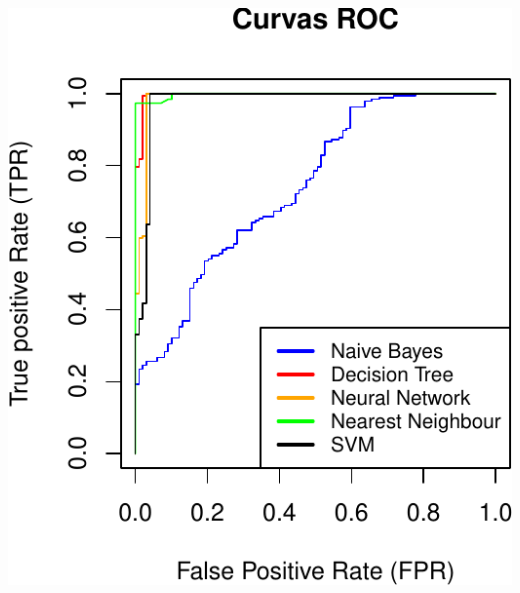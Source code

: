 \documentclass[
]{article}
\begin{document}
\includegraphics{R_2_files/figure-latex/unnamed-chunk-12-1.pdf}
\end{document}
